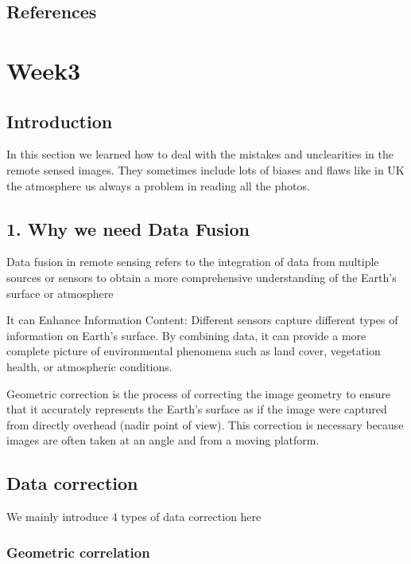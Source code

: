 \documentclass[
  letterpaper,
  DIV=11,
  numbers=noendperiod]{scrreprt}
\begin{document}
\section{\texorpdfstring{\textbf{References}}{References}}\label{references}


\chapter{Week3}\label{week3}

\section{Introduction}\label{introduction-1}

In this section we learned how to deal with the mistakes and
unclearities in the remote sensed images. They sometimes include lots of
biases and flaws like in UK the atmosphere us always a problem in
reading all the photos.

\section{1. Why we need Data Fusion}\label{why-we-need-data-fusion}

Data fusion in remote sensing refers to the integration of data from
multiple sources or sensors to obtain a more comprehensive understanding
of the Earth's surface or atmosphere

It can Enhance Information Content: Different sensors capture different
types of information on Earth's surface. By combining data, it can
provide a more complete picture of environmental phenomena such as land
cover, vegetation health, or atmospheric conditions.

Geometric correction is the process of correcting the image geometry to
ensure that it accurately represents the Earth's surface as if the image
were captured from directly overhead (nadir point of view). This
correction is necessary because images are often taken at an angle and
from a moving platform.

\section{Data correction}\label{data-correction}

We mainly introduce 4 types of data correction here

\subsection{Geometric correlation}\label{geometric-correlation}
\end{document}
